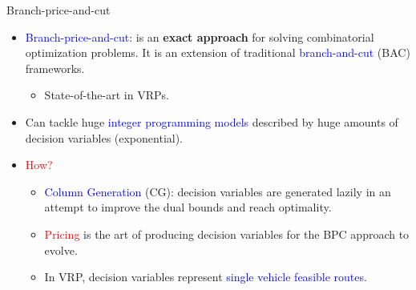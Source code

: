 \begin{frame}{Branch-price-and-cut}
	\begin{itemize}
		\item \textcolor{blue}{Branch-price-and-cut}: is an \textbf{exact approach} for solving combinatorial optimization problems. It is an extension of traditional \textcolor{blue}{branch-and-cut} (BAC) frameworks.
		      \begin{itemize}
			      \item State-of-the-art in VRPs.
		      \end{itemize}
		\item Can tackle huge \textcolor{blue}{integer programming models} described by huge amounts of decision variables (exponential).
		\item \textcolor{red}{How?}
		      \begin{itemize}
			      \item \textcolor{blue}{Column Generation} (CG): decision variables are generated lazily in an attempt to improve the dual bounds and reach optimality.
			      \item \textcolor{red}{Pricing} is the art of producing decision variables for the BPC approach to evolve.
			      \item In VRP, decision variables represent \textcolor{blue}{single vehicle feasible routes}.
		      \end{itemize}
	\end{itemize}
\end{frame}

